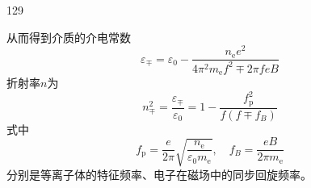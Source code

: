 \begin{solution}{129}
\begin{subsolution}
\begin{equation}
            \label{eq:12.s129}
        \end{equation}
        从而得到介质的介电常数
        \begin{equation}
            \varepsilon_ {\mp} = \varepsilon_ {0} - \frac {n _ {\mathrm{e}} e ^ {2}}{4 \pi^ {2} m _ {\mathrm{e}} f ^ {2} \mp 2 \pi f e B}
            \label{eq:13.s129}
        \end{equation}
        折射率$n$为
        \begin{equation}
            n _ {\mp} ^ {2} = \frac {\varepsilon_ {\mp}}{\varepsilon_ {0}} = 1 - \frac {f _ {\mathrm{p}} ^ {2}}{f (f \mp f _ {B})}
            \label{eq:14.s129}
        \end{equation}
        式中
        \begin{equation}
            f _ {\mathrm{p}} = \frac {e}{2 \pi} \sqrt {\frac {n _ {\mathrm{e}}}{\varepsilon_ {0} m _ {\mathrm{e}}}}, \quad f _ {B} = \frac {e B}{2 \pi m _ {\mathrm{e}}}
            \label{eq:15.s129}
        \end{equation}
        分别是等离子体的特征频率、电子在磁场中的同步回旋频率。


\end{subsolution}
\end{solution}

